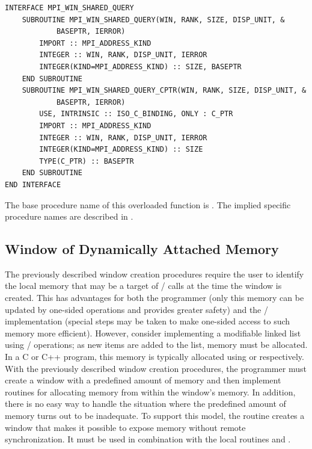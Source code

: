 \begin{verbatim}
INTERFACE MPI_WIN_SHARED_QUERY
    SUBROUTINE MPI_WIN_SHARED_QUERY(WIN, RANK, SIZE, DISP_UNIT, &
            BASEPTR, IERROR)
        IMPORT :: MPI_ADDRESS_KIND
        INTEGER :: WIN, RANK, DISP_UNIT, IERROR
        INTEGER(KIND=MPI_ADDRESS_KIND) :: SIZE, BASEPTR
    END SUBROUTINE
    SUBROUTINE MPI_WIN_SHARED_QUERY_CPTR(WIN, RANK, SIZE, DISP_UNIT, &
            BASEPTR, IERROR)
        USE, INTRINSIC :: ISO_C_BINDING, ONLY : C_PTR
        IMPORT :: MPI_ADDRESS_KIND
        INTEGER :: WIN, RANK, DISP_UNIT, IERROR
        INTEGER(KIND=MPI_ADDRESS_KIND) :: SIZE
        TYPE(C_PTR) :: BASEPTR
    END SUBROUTINE
END INTERFACE
\end{verbatim}
 
The base procedure name of this overloaded function is
\flushline{}. The implied specific
procedure names
are described in .

\subsection{Window of Dynamically Attached Memory}
\label{sec:rma-create-dynamic}

The previously described window creation procedures require the user to identify the local memory
that may be a target of \RMA/ calls at the time the window is created.  
This has advantages for both the
programmer (only this memory can be updated by one-sided operations
and provides greater safety) and the \MPI/ implementation (special steps may
be taken to make one-sided access to such memory more efficient).
However, consider implementing a modifiable linked list using \RMA/
operations; as new items are added to the list, memory must be
allocated.
In a C or C++ program,
this memory is typically allocated using  or
 respectively.  With the previously described window creation procedures, the programmer must create
a window with a predefined amount of memory and then
implement routines for allocating memory from within the window's
memory.  In addition, there is no easy way to handle the situation
where the predefined amount of memory turns out to be inadequate.
To support this model, the routine 
creates a window that makes it possible to expose memory
without remote synchronization. It must be used in combination with the local
routines  and .

